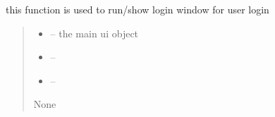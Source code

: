 \documentclass[letterpaper,10pt,english]{sphinxmanual}
\begin{document}
\begin{savenotes}\begin{fulllineitems}
\label{\detokenize{setting/backend/user_login_logout_funcs:oxin.backend.user_login_logout_funcs.run_login_window}}
\pysigstartsignatures
{}
\pysigstopsignatures
\sphinxAtStartPar
this function is used to run/show login window for user login
\begin{quote}\begin{description}
\begin{itemize}
\item {} 
\sphinxAtStartPar
{} – the main ui object

\item {} 
\sphinxAtStartPar
{} – 

\item {} 
\sphinxAtStartPar
{} – 

\end{itemize}

\sphinxAtStartPar
None

\end{description}\end{quote}

\end{fulllineitems}\end{savenotes}

\end{document}
